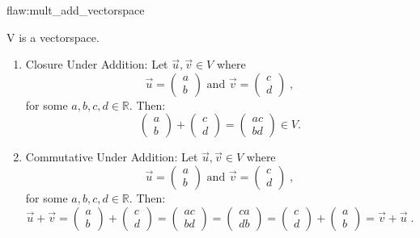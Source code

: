 \begin{flaw}{flaw:mult_add_vectorspace} %

V is a vectorspace.
\begin{enumerate}
\item Closure Under Addition: Let $\vec{u}, \vec{v} \in V$ where $$ \vec{u} = \begin{pmatrix}
a \\
b
\end{pmatrix} \text{ and } \vec{v} = \begin{pmatrix}
c \\
d
\end{pmatrix}\;,$$
for some $a,b,c,d \in \mathbb{R}.$
Then:
$$\begin{pmatrix}
a \\
b
\end{pmatrix} + \begin{pmatrix}
c \\
d
\end{pmatrix} = \begin{pmatrix}
ac \\
bd
\end{pmatrix} \in V.$$

\item Commutative Under Addition: Let $\vec{u}, \vec{v} \in V$ where $$ \vec{u} = \begin{pmatrix}
a \\
b
\end{pmatrix} \text{ and } \vec{v} = \begin{pmatrix}
c \\
d
\end{pmatrix}\;,$$
for some $a,b,c,d \in \mathbb{R}.$
Then:
$$\vec{u} + \vec{v} = \begin{pmatrix}
a \\
b
\end{pmatrix} + \begin{pmatrix}
c \\
d
\end{pmatrix} = \begin{pmatrix}
ac \\
bd
\end{pmatrix} = \begin{pmatrix}
ca \\
db
\end{pmatrix} = \begin{pmatrix}
c \\
d
\end{pmatrix} + \begin{pmatrix}
a \\
b
\end{pmatrix} = \vec{v} + \vec{u}\;.$$


\end{enumerate}
\end{flaw}
